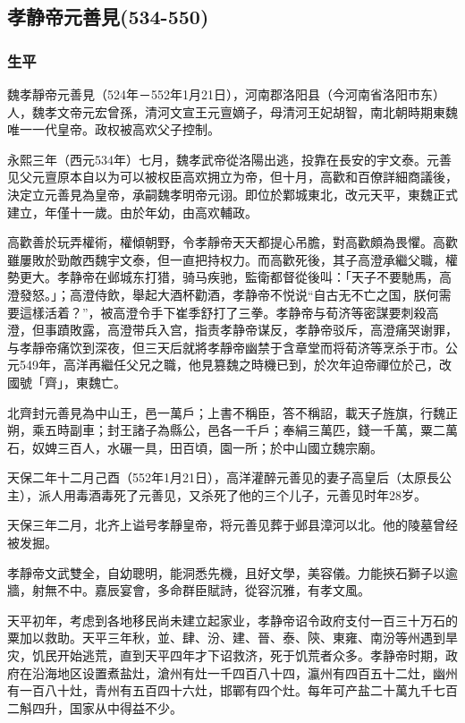 
\subsection{孝静帝元善見\tiny(534-550)}

\subsubsection{生平}

魏孝靜帝元善見（524年－552年1月21日），河南郡洛阳县（今河南省洛阳市东）人，魏孝文帝元宏曾孫，清河文宣王元亶嫡子，母清河王妃胡智，南北朝時期東魏唯一一代皇帝。政权被高欢父子控制。

永熙三年（西元534年）七月，魏孝武帝從洛陽出逃，投靠在長安的宇文泰。元善见父元亶原本自以为可以被权臣高欢拥立为帝，但十月，高歡和百僚詳細商議後，決定立元善見為皇帝，承嗣魏孝明帝元诩。即位於鄴城東北，改元天平，東魏正式建立，年僅十一歲。由於年幼，由高欢輔政。

高歡善於玩弄權術，權傾朝野，令孝靜帝天天都提心吊膽，對高歡頗為畏懼。高歡雖屢敗於勁敵西魏宇文泰，但一直把持权力。而高歡死後，其子高澄承繼父職，權勢更大。孝静帝在邺城东打猎，骑马疾驰，監衛都督從後叫：「天子不要馳馬，高澄發怒。」；高澄侍飲，舉起大酒杯勸酒，孝静帝不悦说“自古无不亡之国，朕何需要這樣活着？”，被高澄令手下崔季舒打了三拳。孝静帝与荀济等密謀要刺殺高澄，但事蹟敗露，高澄带兵入宫，指责孝静帝谋反，孝静帝驳斥，高澄痛哭谢罪，与孝靜帝痛饮到深夜，但三天后就將孝靜帝幽禁于含章堂而将荀济等烹杀于市。公元549年，高洋再繼任父兄之職，他見篡魏之時機已到，於次年迫帝禪位於己，改國號「齊」，東魏亡。

北齊封元善見為中山王，邑一萬戶；上書不稱臣，答不稱詔，載天子旌旗，行魏正朔，乘五時副車；封王諸子為縣公，邑各一千戶；奉絹三萬匹，錢一千萬，粟二萬石，奴婢三百人，水碾一具，田百頃，園一所；於中山國立魏宗廟。

天保二年十二月己酉（552年1月21日），高洋灌醉元善见的妻子高皇后（太原長公主），派人用毒酒毒死了元善见，又杀死了他的三个儿子，元善见时年28岁。

天保三年二月，北齐上谥号孝靜皇帝，将元善见葬于邺县漳河以北。他的陵墓曾经被发掘。

孝靜帝文武雙全，自幼聰明，能洞悉先機，且好文學，美容儀。力能挾石獅子以逾牆，射無不中。嘉辰宴會，多命群臣賦詩，從容沉雅，有孝文風。

天平初年，考虑到各地移民尚未建立起家业，孝静帝诏令政府支付一百三十万石的粟加以救助。天平三年秋，並、肆、汾、建、晉、泰、陝、東雍、南汾等州遇到旱灾，饥民开始逃荒，直到天平四年才下诏救济，死于饥荒者众多。孝静帝时期，政府在沿海地区设置煮盐灶，滄州有灶一千四百八十四，瀛州有四百五十二灶，幽州有一百八十灶，青州有五百四十六灶，邯鄲有四个灶。每年可产盐二十萬九千七百二斛四升，国家从中得益不少。

